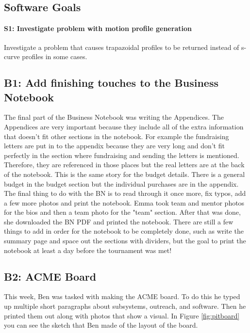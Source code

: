 \documentclass{article}
\begin{document}
\subsection{Software Goals}
\paragraph{S1: Investigate problem with motion profile generation}
 Investigate a problem that causes trapazoidal profiles to be returned instead of s-curve profiles in some cases.
\newpage
\subsection{B1: Add finishing touches to the Business Notebook}

The final part of the Business Notebook was writing the Appendices. The Appendices are very important because they include all of the extra information that doesn't fit other sections in the notebook. For example the fundraising letters are put in to the appendix because they are very long and don't fit perfectly in the section where fundraising and sending the letters is mentioned. Therefore, they are referenced in those places but the real letters are at the back of the notebook. This is the same story for the budget details. There is a general budget in the budget section but the individual purchases are in the appendix. \\
The final thing to do with the BN is to read through it once more, fix typos, add a few more photos and print the notebook. Emma took team and mentor photos for the bios and then a team photo for the "team" section. After that was done, she downloaded the BN PDF and printed the notebook. There are still a few things to add in order for the notebook to be completely done, such as write the summary page and space out the sections with dividers, but the goal to print the notebook at least a day before the tournament was met!

\subsection{B2: ACME Board}

This week, Ben was tasked with making the ACME board. To do this he typed up multiple short paragraphs about subsystems, outreach, and software. Then he printed them out along with photos that show a visual. In Figure \ref{fig:pitboard} you can see the sketch that Ben made of the layout of the board. 
\end{document}
